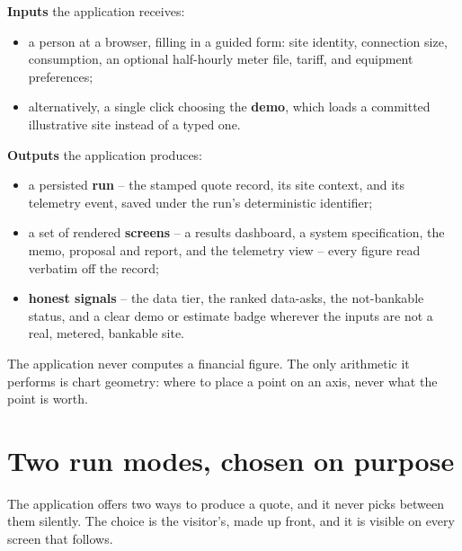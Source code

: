 \begin{contract}
\textbf{Inputs} the application receives:
\begin{itemize}
  \item a person at a browser, filling in a guided form: site identity, connection size, consumption, an optional half-hourly meter file, tariff, and equipment preferences;
  \item alternatively, a single click choosing the \textbf{demo}, which loads a committed illustrative site instead of a typed one.
\end{itemize}
\textbf{Outputs} the application produces:
\begin{itemize}
  \item a persisted \textbf{run} -- the stamped quote record, its site context, and its telemetry event, saved under the run's deterministic identifier;
  \item a set of rendered \textbf{screens} -- a results dashboard, a system specification, the memo, proposal and report, and the telemetry view -- every figure read verbatim off the record;
  \item \textbf{honest signals} -- the data tier, the ranked data-asks, the not-bankable status, and a clear demo or estimate badge wherever the inputs are not a real, metered, bankable site.
\end{itemize}
The application never computes a financial figure. The only arithmetic it performs is chart geometry: where to place a point on an axis, never what the point is worth.
\end{contract}

\section{Two run modes, chosen on purpose}

The application offers two ways to produce a quote, and it never picks between them silently. The choice is the visitor's, made up front, and it is visible on every screen that follows.

